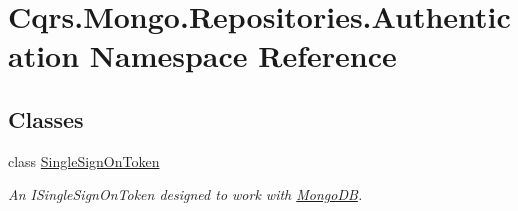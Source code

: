 \hypertarget{namespaceCqrs_1_1Mongo_1_1Repositories_1_1Authentication}{}\section{Cqrs.\+Mongo.\+Repositories.\+Authentication Namespace Reference}
\label{namespaceCqrs_1_1Mongo_1_1Repositories_1_1Authentication}
\subsection*{Classes}
\begin{DoxyCompactItemize}
\item 
class \hyperlink{classCqrs_1_1Mongo_1_1Repositories_1_1Authentication_1_1SingleSignOnToken}{Single\+Sign\+On\+Token}
\begin{DoxyCompactList}\small\item\em An I\+Single\+Sign\+On\+Token designed to work with \hyperlink{namespaceCqrs_1_1MongoDB}{Mongo\+DB}. \end{DoxyCompactList}\end{DoxyCompactItemize}

